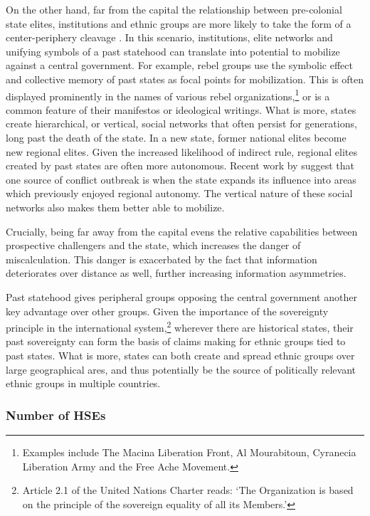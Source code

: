On the other hand, far from the capital the relationship between pre-colonial
state elites, institutions and ethnic groups are more likely to take the form of
a center-periphery cleavage \citep{1967Psav}. In this scenario, institutions,
elite networks and unifying symbols of a past statehood can translate into
potential to mobilize against a central government. For example, rebel groups
use the symbolic effect and collective memory of past states as focal points for
mobilization. This is often displayed prominently in the names of various rebel
organizations,\footnote{Examples include The Macina Liberation Front, Al
Mourabitoun, Cyranecia Liberation Army and the Free Ache Movement.} or is a
common feature of their manifestos or ideological writings. What is more, states
create hierarchical, or vertical, social networks that often persist for
generations, long past the death of the state. In a new state, former national
elites become new regional elites. Given the increased likelihood of indirect
rule, regional elites created by past states are often more autonomous. Recent
work by \citet{Ying_2020} suggest that one source of conflict outbreak is when
the state expands its influence into areas which previously enjoyed regional
autonomy. The vertical nature of these social networks also makes them better
able to mobilize. 

Crucially, being far away from the capital evens the relative capabilities
between prospective challengers and the state, which increases the danger of
miscalculation. This danger is exacerbated by the fact that information
deteriorates over distance as well, further increasing information asymmetries.

Past statehood gives peripheral groups opposing the central government another
key advantage over other groups. Given the importance of the sovereignty
principle in the international system,\footnote{Article 2.1 of the United
	Nations Charter reads: `The Organization is based on the principle of
the sovereign equality of all its Members.'} wherever there are historical
states, their past sovereignty can form the basis of claims making for ethnic
groups tied to past states. What is more, states can both create and spread
ethnic groups over large geographical ares, and thus potentially be the source
of politically relevant ethnic groups in multiple countries. 

\subsubsection{Number of HSEs} \label{Number of HSEs}

